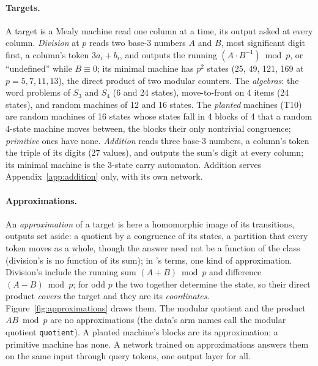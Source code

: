 \documentclass[11pt]{article}
\begin{document}
\paragraph{Targets.} A target is a Mealy machine read one column at a time, its output asked at every
column. \emph{Division} at $p$ reads two base-3 numbers $A$ and $B$, most significant digit first, a
column's token $3a_i + b_i$, and outputs the running $(A \cdot B^{-1}) \bmod p$, or ``undefined''
while $B \equiv 0$; its minimal machine has $p^2$ states (25, 49, 121, 169 at $p = 5, 7, 11, 13$),
the direct product of two modular counters. The \emph{algebras}: the word problems of $S_3$ and $S_4$ (6 and
24 states), move-to-front on 4 items (24 states), and random machines of 12 and 16 states. The
\emph{planted} machines (T10) are random machines of 16 states whose states fall in 4 blocks of 4 that
a random 4-state machine moves between, the blocks their only nontrivial congruence; \emph{primitive}
ones have none. \emph{Addition}
reads three base-3 numbers, a column's token the triple of its digits (27 values), and outputs the
sum's digit at every column; its minimal machine is the 3-state carry automaton. Addition serves
Appendix~\ref{app:addition} only, with its own network.

\paragraph{Approximations.} An \emph{approximation} of a target is here a homomorphic image of its
transitions, outputs set aside: a quotient by a congruence of its states, a partition that every
token moves as a whole, though the answer need not be a function of the class (division's is no
function of its sum); in
\citet{egri-nagy-2024-covering-lemma-transformation-semigroups}'s terms, one kind of approximation. Division's include
the running sum $(A + B) \bmod p$ and difference $(A - B) \bmod p$; for odd $p$ the two together
determine the state, so their direct product \emph{covers} the target and they are its
\emph{coordinates}. Figure~\ref{fig:approximations} draws them. The modular quotient and the product $AB \bmod p$ are no approximations (the data's arm names call the modular quotient \texttt{quotient}). A planted
machine's blocks are its approximation; a primitive machine has none. A network trained
on approximations answers them on the same input through query tokens, one output layer for all.
\end{document}
